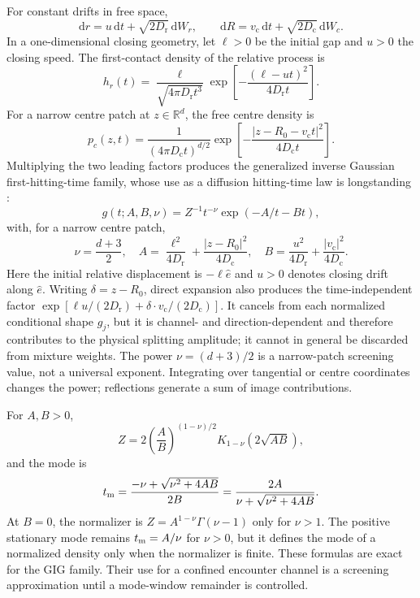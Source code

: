 \documentclass[aps,pre,reprint,amsmath,amssymb,longbibliography,floatfix]{revtex4-2}
\newcommand{\Dr}{D_{\mathrm r}}
\newcommand{\Dc}{D_{\mathrm c}}
\newcommand{\dd}{\mathrm d}
\begin{document}
For constant drifts in free space,
\begin{equation}
\dd r=u\,\dd t+\sqrt{2\Dr}\,\dd W_r,\qquad
\dd R=v_{\mathrm c}\,\dd t+\sqrt{2\Dc}\,\dd W_c.
\label{eq:free-relative-centre}
\end{equation}
In a one-dimensional closing geometry, let \(\ell>0\) be the initial gap and
\(u>0\) the closing speed. The first-contact density of the relative process
is
\begin{equation}
h_r(t)=\frac{\ell}{\sqrt{4\pi\Dr t^3}}
\exp\!\left[-\frac{(\ell-ut)^2}{4\Dr t}\right].
\label{eq:relative-ig}
\end{equation}
For a narrow centre patch at \(z\in\mathbb R^d\), the free centre density is
\begin{equation}
p_c(z,t)=\frac{1}{(4\pi\Dc t)^{d/2}}
\exp\!\left[-\frac{|z-R_0-v_{\mathrm c}t|^2}{4\Dc t}\right].
\label{eq:centre-density}
\end{equation}
Multiplying the two leading factors produces the generalized inverse Gaussian
first-hitting-time family, whose use as a diffusion hitting-time law is
longstanding \cite{barndorffNielsenEtAl1978gig}:
\begin{equation}
g(t;A,B,\nu)=Z^{-1}t^{-\nu}\exp(-A/t-Bt),
\label{eq:gig}
\end{equation}
with, for a narrow centre patch,
\begin{equation}
\nu=\frac{d+3}{2},\quad
A=\frac{\ell^2}{4\Dr}
 +\frac{|z-R_0|^2}{4\Dc},\quad
B=\frac{u^2}{4\Dr}
 +\frac{|v_{\mathrm c}|^2}{4\Dc}.
\label{eq:gig-parameters}
\end{equation}
Here the initial relative displacement is \(-\ell\hat e\) and \(u>0\)
denotes closing drift along \(\hat e\).  Writing \(\delta=z-R_0\), direct
expansion also produces the time-independent factor
\(\exp[\ell u/(2\Dr)+\delta\mathbin{\cdot}v_{\mathrm c}/(2\Dc)]\).
It cancels from each normalized conditional shape \(g_j\), but it is
channel- and direction-dependent and therefore contributes to the physical
splitting amplitude; it cannot in general be discarded from mixture weights.
The power \(\nu=(d+3)/2\) is a narrow-patch screening value, not a universal
exponent. Integrating over tangential or centre coordinates changes the
power; reflections generate a sum of image contributions.

For \(A,B>0\),
\begin{equation}
Z=2\left(\frac AB\right)^{(1-\nu)/2}
K_{1-\nu}(2\sqrt{AB}),
\label{eq:gig-normalization}
\end{equation}
and the mode is
\begin{equation}
t_{\rm m}=
\frac{-\nu+\sqrt{\nu^2+4AB}}{2B}
=\frac{2A}{\nu+\sqrt{\nu^2+4AB}}.
\label{eq:gig-mode}
\end{equation}
At \(B=0\), the normalizer is
\(Z=A^{1-\nu}\Gamma(\nu-1)\) only for \(\nu>1\).  The positive stationary
mode remains \(t_{\rm m}=A/\nu\) for \(\nu>0\), but it defines the mode of a
normalized density only when the normalizer is finite.  These formulas are
exact for the GIG family. Their use for a confined encounter channel is a screening
approximation until a mode-window remainder is controlled.
\end{document}
